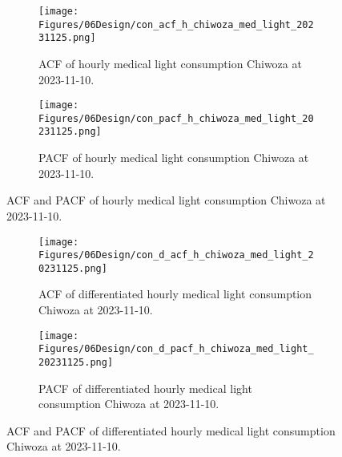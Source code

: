 \begin{figure}
  \centering

  \begin{subfigure}{\textwidth}
    \centering
    \texttt{[image: Figures/06Design/con\_acf\_h\_chiwoza\_med\_light\_20231125.png]}
    \caption[ACF Medical light consumption 20231110]{ACF of hourly medical light consumption Chiwoza at 2023-11-10.}
    \label{fig:con_acf_h_chiwoza_med_light_20231125}
  \end{subfigure}

  \vspace{0.5cm}

  \begin{subfigure}{\textwidth}
    \centering
    \texttt{[image: Figures/06Design/con\_pacf\_h\_chiwoza\_med\_light\_20231125.png]}
    \caption[ACF Medical light consumption 20231110]{PACF of hourly medical light consumption Chiwoza at 2023-11-10.}
    \label{fig:con_pacf_h_chiwoza_med_light_20231125}
  \end{subfigure}

  \caption[ACF and PACF Medical light consumption 20231110]{ACF and PACF of hourly medical light consumption Chiwoza at 2023-11-10.}
  \label{fig:con_acf_pacf_h_chiwoza_med_light_20231125}
\end{figure}

\begin{figure}
  \centering

  \begin{subfigure}{\textwidth}
    \centering
    \texttt{[image: Figures/06Design/con\_d\_acf\_h\_chiwoza\_med\_light\_20231125.png]}
    \caption[ACF differentiated Medical light consumption 20231110]{ACF of differentiated hourly medical light consumption Chiwoza at 2023-11-10.}
    \label{fig:con_d_acf_h_chiwoza_med_light_20231125}
  \end{subfigure}

  \vspace{0.5cm}

  \begin{subfigure}{\textwidth}
    \centering
    \texttt{[image: Figures/06Design/con\_d\_pacf\_h\_chiwoza\_med\_light\_20231125.png]}
    \caption[PACF differentiated medical light consumption 20231110]{PACF of differentiated  hourly medical light consumption Chiwoza at 2023-11-10.}
    \label{fig:con_d_pacf_h_chiwoza_med_light_20231125}
  \end{subfigure}

  \caption[ACF and PACF differentiated medical light consumption 20231110]{ACF and PACF of differentiated hourly medical light consumption Chiwoza at 2023-11-10.}
  \label{fig:con_d_acf_pacf_h_chiwoza_med_light_20231125}
\end{figure}

